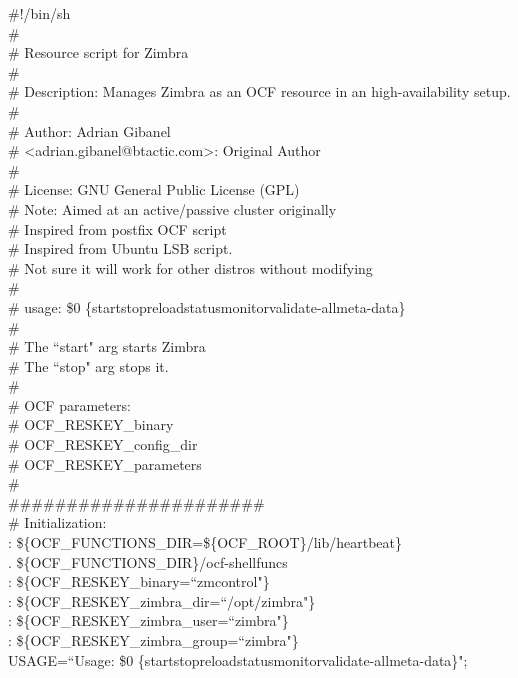\documentclass[a4paper, 12pt]{book}
\begin{document}
\#!/bin/sh\\
\#\\
\# Resource script for Zimbra\\
\#\\
\# Description:  Manages Zimbra as an OCF resource in an high-availability setup.\\
\#\\
\# Author:       Adrian Gibanel\\
\# \textless adrian.gibanel@btactic.com\textgreater : Original Author\\
\#\\
\# License: GNU General Public License (GPL)\\
\# Note:  Aimed at an active/passive cluster originally\\
\#        Inspired from postfix OCF script\\
\#        Inspired from Ubuntu LSB script.\\
\#        Not sure it will work for other distros without modifying\\
\#\\
\#   usage: \$0 \{start\textbar stop\textbar reload\textbar status\textbar monitor\textbar validate-all\textbar meta-data\}\\
\#\\
\#       The ``start" arg starts Zimbra\\
\#       The ``stop" arg stops it.\\
\#\\
\# OCF parameters:\\
\#  OCF\_RESKEY\_binary\\
\#  OCF\_RESKEY\_config\_dir\\
\#  OCF\_RESKEY\_parameters\\
\#\\
\#\#\#\#\#\#\#\#\#\#\#\#\#\#\#\#\#\#\#\#\#\#\\

\noindent \# Initialization:\\

\noindent : \$\{OCF\_FUNCTIONS\_DIR=\$\{OCF\_ROOT\}/lib/heartbeat\}\\
. \$\{OCF\_FUNCTIONS\_DIR\}/ocf-shellfuncs\\
: \$\{OCF\_RESKEY\_binary=``zmcontrol"\}\\
: \$\{OCF\_RESKEY\_zimbra\_dir=``/opt/zimbra"\}\\
: \$\{OCF\_RESKEY\_zimbra\_user=``zimbra"\}\\
: \$\{OCF\_RESKEY\_zimbra\_group=``zimbra"\}\\
USAGE=``Usage: \$0 \{start\textbar stop\textbar reload\textbar status\textbar monitor\textbar validate-all\textbar meta-data\}";\\
\end{document}
